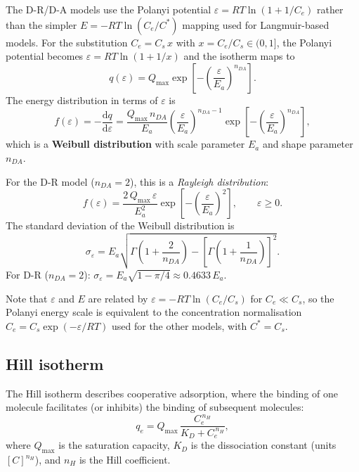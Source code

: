 	The D-R/D-A models use the Polanyi potential
	$\varepsilon = RT\ln(1 + 1/C_e)$ rather than the simpler
	$E = -RT\ln(C_e/C^{\ast})$ mapping used for Langmuir-based
	models.  For the substitution $C_e = C_s\,x$ with
	$x = C_e/C_s \in (0,1]$, the Polanyi potential becomes
	$\varepsilon = RT\ln(1 + 1/x)$ and the isotherm maps to
	\begin{equation}
		q(\varepsilon)
		= Q_{\max}
		\exp\!\left[-\left(\frac{\varepsilon}{E_a}
		\right)^{n_{DA}}\right].
		\label{eq:qeps_DA}
	\end{equation}
	The energy distribution in terms of $\varepsilon$ is
	\begin{equation}
		f(\varepsilon)
		= -\frac{\mathrm{d}q}{\mathrm{d}\varepsilon}
		= \frac{Q_{\max}\, n_{DA}}{E_a}
		\left(\frac{\varepsilon}{E_a}\right)^{n_{DA}-1}
		\exp\!\left[-\left(\frac{\varepsilon}{E_a}
		\right)^{n_{DA}}\right],
		\label{eq:feps_DA}
	\end{equation}
	which is a \textbf{Weibull distribution} with scale parameter
	$E_a$ and shape parameter $n_{DA}$.

	For the D-R model ($n_{DA} = 2$), this is a \emph{Rayleigh
	distribution}:
	\begin{equation}
		f(\varepsilon)
		= \frac{2\,Q_{\max}\,\varepsilon}{E_a^2}
		\exp\!\left[-\left(\frac{\varepsilon}{E_a}
		\right)^{2}\right],
		\qquad \varepsilon \geq 0.
	\end{equation}
	The standard deviation of the Weibull distribution is
	\begin{equation}
		\sigma_\varepsilon
		= E_a\sqrt{
		\Gamma\!\left(1 + \frac{2}{n_{DA}}\right)
		- \left[\Gamma\!\left(1 + \frac{1}{n_{DA}}\right)
		\right]^{2}}.
		\label{eq:sigmaeps_DA}
	\end{equation}
	For D-R ($n_{DA} = 2$):
	$\sigma_\varepsilon
	= E_a\sqrt{1 - \pi/4}
	\approx 0.4633\,E_a$.

	Note that $\varepsilon$ and $E$ are related by
	$\varepsilon = -RT\ln(C_e/C_s)$ for $C_e \ll C_s$, so the
	Polanyi energy scale is equivalent to the concentration
	normalisation $C_e = C_s\exp(-\varepsilon/RT)$ used for the
	other models, with $C^{\ast} = C_s$.

	\subsection{Hill isotherm}

	The Hill isotherm describes cooperative adsorption, where the
	binding of one molecule facilitates (or inhibits) the binding of
	subsequent molecules:
	\begin{equation}
		q_e = Q_{\max}\,\frac{C_e^{\,n_H}}{K_D + C_e^{\,n_H}},
		\label{eq:Hill}
	\end{equation}
	where $Q_{\max}$ is the saturation capacity, $K_D$ is the
	dissociation constant (units $[C]^{n_H}$), and $n_H$ is the
	Hill coefficient.

